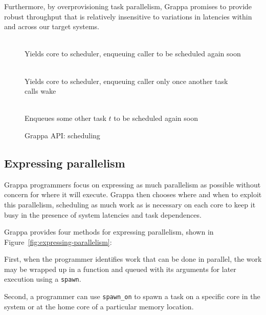 Furthermore, by overprovisioning task parallelism, Grappa promises to provide robust throughput that is relatively insensitive to variations in latencies within and across our target systems.

\begin{figure}[htbp]
  \begin{center}
    \begin{description}\small
    \item[ \texttt{ yield() } ] \hfill \\
      Yields core to scheduler, enqueuing caller to be scheduled again soon
    \item[ \texttt{ suspend() } ] \hfill \\
      Yields core to scheduler, enqueuing caller only once another task calls wake
    \item[ \texttt{ wake( task * $t$ ) } ] \hfill \\
      Enqueues some other task $t$ to be scheduled again soon
    \end{description}
    \begin{minipage}{0.95\columnwidth}
      \caption{\label{fig:scheduling} Grappa API: scheduling} %
    \end{minipage}
  \end{center}
\end{figure}


\subsection{Expressing parallelism}

Grappa programmers focus on expressing as much
parallelism as possible without concern for where it will execute.
Grappa then chooses where and when to exploit this parallelism,
scheduling as much work as is necessary on each core to keep it busy
in the presence of system latencies and task dependences.

Grappa provides four methods for expressing parallelism, shown in
Figure~\ref{fig:expressing-parallelism}:

First, when the programmer identifies work
that can be done in parallel, the work may be wrapped up in a function
and queued with its arguments for later execution using a
\texttt{spawn}.

Second, a programmer can use \texttt{spawn\_on} to spawn a task on a
specific core in the system or at the home core of a particular memory
location.

